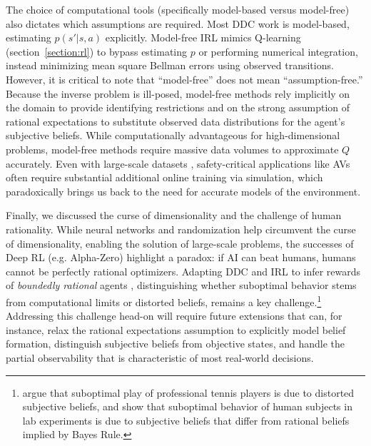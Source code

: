 The choice of computational tools (specifically model-based versus model-free) also dictates which assumptions are required.
Most DDC work is model-based, estimating $p(s'|s,a)$ explicitly. Model-free IRL mimics Q-learning (section~\ref{section:rl}) to bypass estimating $p$ or performing
numerical integration, instead minimizing mean square Bellman errors using observed transitions.
However, it is critical to note that ``model-free'' does not mean ``assumption-free.'' Because the inverse problem is ill-posed, model-free methods rely implicitly on the
domain to provide identifying restrictions and on the strong assumption of rational expectations to substitute observed data distributions for the agent's subjective beliefs.
While computationally advantageous for high-dimensional problems, model-free methods require massive data volumes to approximate $Q$ accurately.
Even with large-scale datasets \citep{mero:2022}, safety-critical applications like AVs often require substantial additional online training via simulation,
which paradoxically brings us back to the need for accurate models of the environment.

Finally, we discussed the curse of dimensionality and the challenge of human rationality.
While neural networks and randomization help circumvent the curse of dimensionality, enabling the solution of large-scale problems,
the successes of Deep RL (e.g. Alpha-Zero) highlight a paradox: if AI can beat humans, humans cannot be perfectly rational optimizers.
Adapting DDC and IRL to infer rewards of {\it boundedly rational\/} agents \citep{Simon:1957}, distinguishing whether suboptimal behavior stems from
computational limits or distorted beliefs, remains a key challenge.\footnote{\footnotesize \citet{tennis:2025} argue that
suboptimal play of professional tennis players is due to distorted subjective beliefs, and \citet{whoismorebayesian:2025} show that suboptimal behavior of
human subjects in lab experiments is due to subjective beliefs that differ from rational beliefs implied by Bayes Rule.}
Addressing this challenge head-on will require future extensions that can, for instance, relax the rational expectations assumption to explicitly model belief formation, distinguish subjective beliefs from objective states, and handle the partial observability that is characteristic of most real-world decisions.
